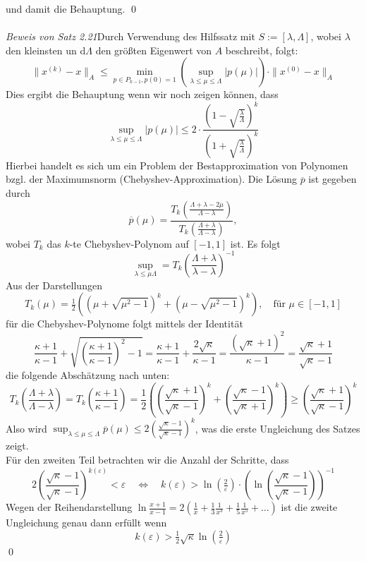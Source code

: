 \documentclass{article}
\begin{document}
    und damit die Behauptung. \qed \\ \\
    \textit{Beweis von Satz 2.21}Durch Verwendung des Hilfssatz mit $S:=[\lambda, \Lambda]$, 
    wobei $\lambda$ den kleinsten un d$\Lambda$ den größten Eigenwert von $A$ beschreibt, folgt:
    \[\|x^{(k)}-x\|_A \leq \min_{p\in P_{k-1}, p(0)=1} 
    \left(\sup_{\lambda\leq\mu\leq\Lambda}|p(\mu)|\right)\cdot\|x^{(0)}-x\|_A \]
    Dies ergibt die Behauptung wenn wir noch zeigen können, dass 
    \[\sup_{\lambda\leq\mu\leq\Lambda}|p(\mu)| 
    \leq 2\cdot \dfrac{(1-\sqrt{\tfrac{\lambda}{\Lambda}})^k}{(1+\sqrt{\tfrac{\lambda}{\Lambda}})^k}\]
    Hierbei handelt es sich um ein Problem der Bestapproximation von Polynomen bzgl. 
    der Maximumsnorm (Chebyshev-Approximation).
    Die Lösung $\overline{p}$ ist gegeben durch 
    \[\overline{p}(\mu) = \dfrac{T_k(\tfrac{\Lambda+\lambda-2\mu}{\Lambda-\lambda})}
    {T_k(\tfrac{\Lambda+\lambda}{\Lambda-\lambda})},\]
    wobei $T_k$ das $k$-te Chebyshev-Polynom auf $[-1,1]$ ist. Es folgt
    \[\sup_{\lambda\leq\mu\Lambda} = T_k\left(\dfrac{\Lambda+\lambda}{\lambda-\lambda}\right)^{-1}\]
    Aus der Darstellungen
    \[T_k(\mu) = \tfrac{1}{2}\left((\mu+\sqrt{\mu^2-1})^k+(\mu-\sqrt{\mu^2-1})^k\right), 
    \quad \text{für } \mu\in[-1,1]\]
    für die Chebyshev-Polynome folgt mittels der Identität
    \[\dfrac{\kappa+1}{\kappa-1} + \sqrt{\left(\dfrac{\kappa+1}{\kappa-1}\right)^2-1} 
    = \dfrac{\kappa+1}{\kappa-1} + \dfrac{2\sqrt{\kappa}}{\kappa-1} = \dfrac{(\sqrt{\kappa}+1)^2}{\kappa - 1}
    = \dfrac{\sqrt{\kappa}+1}{\sqrt{\kappa}-1}\]
    die folgende Abschätzung nach unten:
    \[T_k\left(\dfrac{\Lambda+\lambda}{\Lambda-\lambda}\right) = T_k\left(\dfrac{\kappa+1}{\kappa-1}\right)
    = \dfrac{1}{2}\left(\left(\dfrac{\sqrt{\kappa}+1}{\sqrt{\kappa}-1}\right)^k + 
    \left(\dfrac{\sqrt{\kappa}-1}{\sqrt{\kappa}+1}\right)^k\right) 
    \geq \left(\dfrac{\sqrt{\kappa}+1}{\sqrt{\kappa}-1}\right)^k\]
    Also wird $\sup_{\lambda\leq\mu\leq\Lambda}\overline{p}(\mu)
    \leq 2\left(\tfrac{\sqrt{\kappa}-1}{\sqrt{\kappa}-1}\right)^k$, was die erste Ungleichung des Satzes zeigt. \\
    Für den zweiten Teil betrachten wir die Anzahl der Schritte, dass
    \[2\left(\dfrac{\sqrt{\kappa}-1}{\sqrt{\kappa}-1}\right)^{k(\varepsilon)} < \varepsilon \quad \iff \quad 
    k(\varepsilon) > \ln(\tfrac{2}{\varepsilon})\cdot
    \left(\ln\left(\dfrac{\sqrt{\kappa}-1}{\sqrt{\kappa}-1}\right)\right)^{-1}\]
    Wegen der Reihendarstellung $\ln\tfrac{x+1}{x-1} = 2(\tfrac{1}{x} + \tfrac{1}{3}\tfrac{1}{x^3} 
    + \tfrac{1}{5}\tfrac{1}{x^5} + \dotsc)$ ist die zweite Ungleichung genau dann erfüllt wenn 
    \[k(\varepsilon) > \tfrac{1}{2}\sqrt{\kappa}\ln(\tfrac{2}{\varepsilon})\]
    \qed
\end{document}
